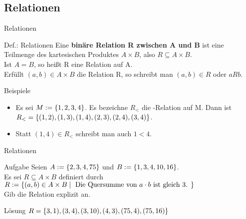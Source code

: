 \subsection{Relationen}
	\begin{frame}{Relationen}
		\begin{block}{Def.: Relationen}
			Eine \textbf{binäre Relation R zwischen A und B} ist eine Teilmenge des kartesischen Produktes $A \times B$, also $R \subseteq A \times B$.\\
			Ist $A=B$, so heißt R eine Relation auf A.\\
			Erfüllt $(a,b) \in A \times B$ die Relation R, so schreibt man $(a,b) \in R$ oder $aRb$.
		\end{block}
	
		\begin{exampleblock}{Beispiele}
			\begin{itemize}
				\item Es sei $M:=\{ 1,2,3,4 \}$. Es bezeichne $R_<$ die -Relation auf M. Dann ist $R_< = \{ (1,2),(1,3),(1,4),(2,3),(2,4),(3,4) \}$.
				\item Statt $(1,4) \in R_<$ schreibt man auch $1 < 4$.
			\end{itemize}
		\end{exampleblock}
	\end{frame}

	\begin{frame}{Relationen}
		\begin{exampleblock}{Aufgabe}
			Seien $A:=\{ 2,3,4,75 \}$ und $B:=\{ 1,3,4,10,16 \}$.\\ 
			Es sei $R \subseteq A \times B $ definiert durch $R:=\{ (a,b) \in A \times B \mid \text{ Die Quersumme von $a \cdot b$ ist gleich 3. } \}$\\
			Gib die Relation explizit an.
		\end{exampleblock}
	\pause
		\begin{block}{Lösung}		
			$R=\{ 3,1),(3,4),(3,10),(4,3),(75,4),(75,16) \}$
		\end{block}
	\end{frame}


\section{}
